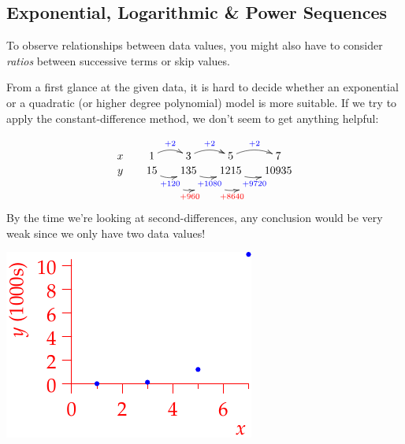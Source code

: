 \clearpage



\subsection{Exponential, Logarithmic \& Power Sequences}

To observe relationships between data values, you might also have to consider \emph{ratios} between successive terms or skip values.

\begin{example}{}{}
	From a first glance at the given data, it is hard to decide whether an exponential or a quadratic (or higher degree polynomial) model is more suitable. If we try to apply the constant-difference method, we don't seem to get anything helpful:\par
	\begin{minipage}[t]{0.65\linewidth}\vspace{0pt}
		\[
			\xymatrix @R0pt @C15pt{
				x & 1 \ar@/^/[r]^{\textcolor{blue}{+2}} & 3 \ar@/^/[r]^{\textcolor{blue}{+2}} &  5 \ar@/^/[r]^{\textcolor{blue}{+2}} & 7 \\
				y & 15 \ar@/_/[r]_{\textcolor{blue}{+120}}="a" & 135 \ar@/_/[r]_{\textcolor{blue}{+1080}}="b" & 1215 \ar@/_/[r]_{\textcolor{blue}{+9720}}="c" & 10935 
				\ar @/_/_{\textcolor{red}{+960}} "a";"b" \ar @/_/_{\textcolor{red}{+8640}} "b";"c" 
			}
		\]
		By the time we're looking at second-differences, any conclusion would be very weak since we only have two data values!
	\end{minipage}
	\hfill
	\begin{minipage}[t]{0.34\linewidth}\vspace{-10pt}
		\flushright\includegraphics{seqquadex4}
	\end{minipage}\medbreak


\end{example}
